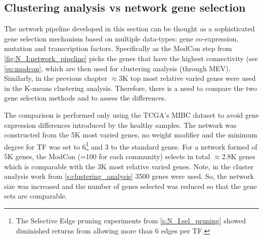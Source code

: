 


\subsection{Clustering analysis vs network gene selection} \label{s:N_I:cs_vs_gene_sel}

The network pipeline developed in this section can be thought as a sophisticated gene selection mechanism based on multiple data-types: gene co-expression, mutation and transcription factors. Specifically as the ModCon step from  \cref{fig:N_I:network_pipeline} picks the genes that have the highest connectivity (see \cref{eq:modcon}, which are then used for clustering analysis (through MEV). Similarly, in the previous chapter $\approx$3K top most relative varied genes were used in the K-means clustering analysis. Therefore, there is a need to compare the two gene selection methods and to assess the differences.

The comparison is performed only using the TCGA's MIBC dataset to avoid gene expression differences introduced by the healthy samples. The network was constructed from the 5K most varied genes, no weight modifier and the minimum degree for TF  was set to 6\footnote{The Selective Edge pruning experiments from \cref{s:N_I:sel_pruning} showed diminished returns from allowing more than 6 edges per TF.} and 3 to the standard genes. For a network formed of 5K genes, the ModCon (=100 for each community) selects in total $\approx$2.8K genes which is comparable with the 3K most relative varied genes. Note, in the cluster analysis work from \cref{s:clustering_analysis} 3500 genes were used. So, the network size was increased and the number of genes selected was reduced so that the gene sets are comparable.

